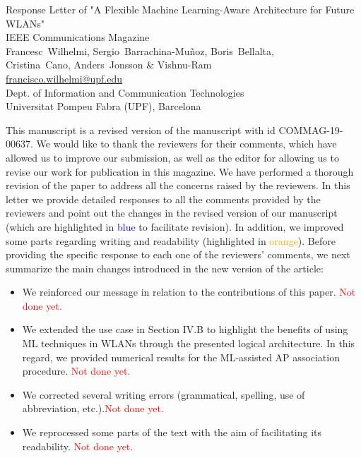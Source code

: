 \documentclass[a4paper,twoside,11pt]{reviewresponse}
\makeatletter
\newcommand{\myAuthors}{Francesc~Wilhelmi, Sergio~Barrachina-Mu\~noz, Boris~Bellalta,\\ Cristina~Cano, Anders~Jonsson \& Vishnu-Ram}
\newcommand{\myEmail}{francisco.wilhelmi@upf.edu}
\newcommand{\myTitle}{Response Letter of "A Flexible Machine Learning-Aware Architecture for Future WLANs"}
\newcommand{\myJournal}{IEEE Communications Magazine}
\newcommand{\myDept}{Dept. of Information and Communication Technologies \\ Universitat Pompeu Fabra (UPF), Barcelona}
\makeatother
\begin{document}
	
	\thispagestyle{plain}
	
	\begin{center}
		{\LARGE\myTitle} \vspace{0.5cm} \\
		{\large\myJournal} \vspace{0.5cm} \\
		\myAuthors \\
		\url{\myEmail} \vspace{0.3cm} \\
		\myDept
	\end{center}
	
	\medskip
	
	\medskip
	
	This manuscript is a revised version of the manuscript with id COMMAG-19-00637. We would like to thank the reviewers for their comments, which have allowed us to improve our submission, as well as the editor for allowing us to revise our work for publication in this magazine. We have performed a thorough revision of the paper to address all the concerns raised by the reviewers. In this letter we provide detailed responses to all the comments provided by the reviewers and point out the changes in the revised version of our manuscript (which are highlighted in \textcolor{blue}{blue} to facilitate revision). In addition, we improved some parts regarding writing and readability (highlighted in \textcolor{orange}{orange}). Before providing the specific response to each one of the reviewers’ comments, we next summarize the main changes introduced in the new version of the article:
    
    \begin{itemize}
    	\item We reinforced our message in relation to the contributions of this paper. \textcolor{red}{Not done yet.}
    	\item We extended the use case in Section IV.B to highlight the benefits of using ML techniques in WLANs through the presented logical architecture. In this regard, we provided numerical results for the ML-assisted AP association procedure.    \textcolor{red}{Not done yet.}	
        \item We corrected several writing errors (grammatical, spelling, use of abbreviation, etc.).\textcolor{red}{Not done yet.}
        \item We reprocessed some parts of the text with the aim of facilitating its readability. \textcolor{red}{Not done yet.}
    \end{itemize}
    
\end{document}
